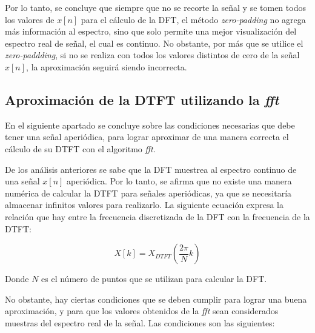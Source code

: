 \documentclass[11pt,a4paper]{article}
\begin{document}
    
    Por lo tanto, se concluye que siempre que no se recorte la señal y se tomen todos los valores de $x[n]$ para el cálculo de la DFT, el método \textit{zero-padding} no agrega más información al espectro, sino que solo permite una mejor visualización del espectro real de señal, el cual es continuo. No obstante, por más que se utilice el \textit{zero-paddding}, si no se realiza con todos los valores distintos de cero de la señal $x[n]$, la aproximación seguirá siendo incorrecta.
    


    \subsection{Aproximación de la DTFT utilizando la \textit{fft}}
        En el siguiente apartado se concluye sobre las condiciones necesarias que debe tener una señal aperiódica, para lograr aproximar de una manera correcta el cálculo de su DTFT con el algoritmo \textit{fft}. 
        
        
        De los análisis anteriores se sabe que la DFT muestrea al espectro continuo de una señal $x[n]$ aperiódica. Por lo tanto, se afirma que no existe una manera numérica de calcular la DTFT para señales aperiódicas, ya que se necesitaría almacenar infinitos valores para realizarlo. La siguiente ecuación expresa la relación que hay entre la frecuencia discretizada de la DFT con la frecuencia de la DTFT: 
        
        \begin{equation}
            X[k]=X_{DTFT}\left(  \frac{2 \pi}{N} k \right)
        \end{equation}

        Donde $N$ es el número de puntos que se utilizan para calcular la DFT.

        No obstante, hay ciertas condiciones que se deben cumplir para lograr una buena aproximación, y para que los valores obtenidos de la \textit{fft} sean considerados muestras del espectro real de la señal. Las condiciones son las siguientes:
\end{document}
